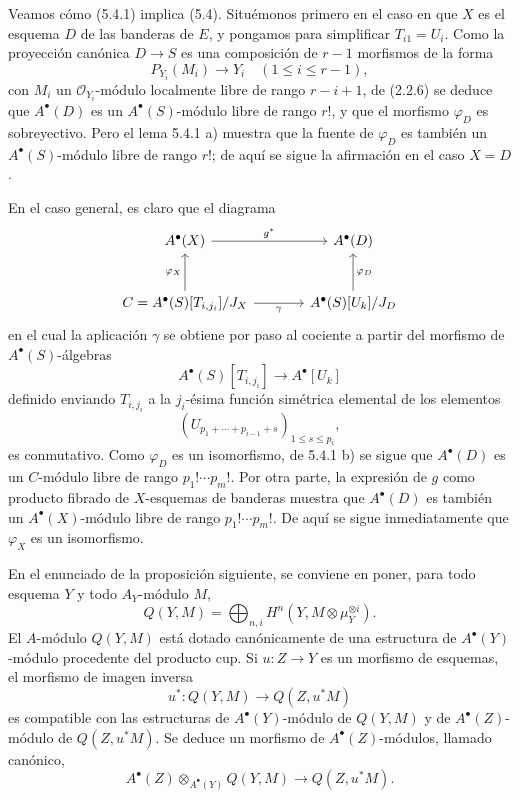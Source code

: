 Veamos cómo (5.4.1) implica (5.4). Situémonos primero en el caso en que $X$ es el esquema $D$ de las banderas de $E$, y pongamos para simplificar $T_{i1}=U_i$. Como la proyección canónica $D\to S$ es una composición de $r-1$ morfismos de la forma
\[
P_{Y_i}(M_i)\to Y_i\quad(1\le i\le r-1),
\]
con $M_i$ un $\mathcal O_{Y_i}$-módulo localmente libre de rango $r-i+1$, de (2.2.6) se deduce que $A^\bullet(D)$ es un $A^\bullet(S)$-módulo libre de rango $r!$, y que el morfismo $\varphi_D$ es sobreyectivo. Pero el lema 5.4.1 a) muestra que la fuente de $\varphi_D$ es también un $A^\bullet(S)$-módulo libre de rango $r!$; de aquí se sigue la afirmación en el caso $X=D$.

En el caso general, es claro que el diagrama
\[
\begin{tikzcd}[column sep=large,row sep=large]
A^\bullet(X) \arrow[r,"g^*"] & A^\bullet(D)\\
C=A^\bullet(S)[T_{i,j_i}]/J_X \arrow[u,"\varphi_X"] \arrow[r,"\gamma"'] &
A^\bullet(S)[U_k]/J_D \arrow[u,"\varphi_D"']
\end{tikzcd}
\]
en el cual la aplicación $\gamma$ se obtiene por paso al cociente a partir del morfismo de $A^\bullet(S)$-álgebras
\[
A^\bullet(S)[T_{i,j_i}]\to A^\bullet[U_k]
\]
definido enviando $T_{i,j_i}$ a la $j_i$-ésima función simétrica elemental de los elementos
\[
(U_{p_1+\cdots+p_{i-1}+s})_{1\le s\le p_i},
\]
es conmutativo. Como $\varphi_D$ es un isomorfismo, de 5.4.1 b) se sigue que $A^\bullet(D)$ es un $C$-módulo libre de rango $p_1!\cdots p_m!$. Por otra parte, la expresión de $g$ como producto fibrado de $X$-esquemas de banderas muestra que $A^\bullet(D)$ es también un $A^\bullet(X)$-módulo libre de rango $p_1!\cdots p_m!$. De aquí se sigue inmediatamente que $\varphi_X$ es un isomorfismo.

En el enunciado de la proposición siguiente, se conviene en poner, para todo esquema $Y$ y todo $A_Y$-módulo $M$,
\[
Q(Y,M)=\bigoplus_{n,i}H^n(Y,M\otimes\mu_Y^{\otimes i}).
\]
El $A$-módulo $Q(Y,M)$ está dotado canónicamente de una estructura de $A^\bullet(Y)$-módulo procedente del producto cup. Si $u:Z\to Y$ es un morfismo de esquemas, el morfismo de imagen inversa
\[
u^*:Q(Y,M)\to Q(Z,u^*M)
\]
es compatible con las estructuras de $A^\bullet(Y)$-módulo de $Q(Y,M)$ y de $A^\bullet(Z)$-módulo de $Q(Z,u^*M)$. Se deduce un morfismo de $A^\bullet(Z)$-módulos, llamado canónico,
\[
A^\bullet(Z)\otimes_{A^\bullet(Y)}Q(Y,M)\to Q(Z,u^*M).
\]

